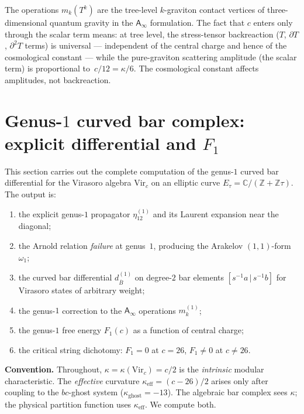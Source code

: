 \documentclass[11pt]{article}
\newcommand{\barB}{\overline{B}}
\newcommand{\C}{\mathbb{C}}
\newcommand{\Z}{\mathbb{Z}}
\newcommand{\Ainf}{\mathsf{A}_{\infty}}
\begin{document}
\begin{remark}
\label{rem:gravitational-feynman-wn}
The operations $m_k(T^k)$ are the tree-level $k$-graviton contact
vertices of three-dimensional quantum gravity in the $\Ainf$
formulation.  The fact that $c$ enters only through the scalar
term means: at tree level, the stress-tensor backreaction ($T$,
$\partial T$, $\partial^2 T$ terms) is universal --- independent
of the central charge and hence of the cosmological constant ---
while the pure-graviton scattering amplitude (the scalar term) is
proportional to~$c/12 = \kappa/6$.  The cosmological constant
affects amplitudes, not backreaction.
\end{remark}




\section{Genus-$1$ curved bar complex: explicit differential and $F_1$}
\label{sec:genus-1-curved-bar}

This section carries out the complete computation of the genus-$1$
curved bar differential for the Virasoro algebra $\mathrm{Vir}_c$
on an elliptic curve $E_\tau = \C / (\Z + \Z\tau)$.  The
output is:
\begin{enumerate}[label=(\roman*)]
\item the explicit genus-$1$ propagator $\eta^{(1)}_{12}$ and its
  Laurent expansion near the diagonal;
\item the Arnold relation \emph{failure} at genus~$1$, producing
  the Arakelov $(1,1)$-form $\omega_1$;
\item the curved bar differential
  $d^{(1)}_{\barB}$ on degree-$2$ bar elements
  $[s^{-1}a \,|\, s^{-1}b]$ for Virasoro states of arbitrary
  weight;
\item the genus-$1$ correction to the $\Ainf$ operations
  $m_k^{(1)}$;
\item the genus-$1$ free energy $F_1(c)$ as a function of central
  charge;
\item the critical string dichotomy: $F_1 = 0$ at $c = 26$,
  $F_1 \neq 0$ at $c \neq 26$.
\end{enumerate}

\medskip

\noindent
\textbf{Convention.}
Throughout, $\kappa = \kappa(\mathrm{Vir}_c) = c/2$ is the
\emph{intrinsic} modular characteristic.  The \emph{effective}
curvature $\kappa_{\mathrm{eff}} = (c-26)/2$ arises only
after coupling to the $bc$-ghost system ($\kappa_{\mathrm{ghost}} = -13$).
The algebraic bar complex sees $\kappa$; the physical partition
function uses $\kappa_{\mathrm{eff}}$.  We compute both.
\end{document}

